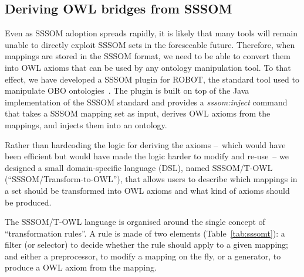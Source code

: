 \documentclass{ceurart}
\begin{document}
\subsection{Deriving OWL bridges from SSSOM}

Even as SSSOM adoption spreads rapidly, it is likely that many tools
will remain unable to directly exploit SSSOM sets in the foreseeable
future.  Therefore, when mappings are stored in the SSSOM format, we
need to be able to convert them into OWL axioms that can be used by any
ontology manipulation tool. To that effect, we have developed a SSSOM
plugin for ROBOT, the standard tool used to manipulate OBO
ontologies~\cite{jackson2019}.  The plugin is built on top of the Java
implementation of the SSSOM standard and provides a \emph{sssom:inject}
command that takes a SSSOM mapping set as input, derives OWL axioms from
the mappings, and injects them into an ontology.

Rather than hardcoding the logic for deriving the axioms --~which would
have been efficient but would have made the logic harder to modify and
re-use~-- we designed a small domain-specific language (DSL), named
SSSOM/T-OWL (``SSSOM/Transform-to-OWL''), that allows users to describe
which mappings in a set should be transformed into OWL axioms and what
kind of axioms should be produced.

The SSSOM/T-OWL language is organised around the single concept of
``transformation rules''. A rule is made of two elements
(Table~\ref{tab:sssomt}): a filter (or selector) to decide whether the
rule should apply to a given mapping; and either a preprocessor, to
modify a mapping on the fly, or a generator, to produce a OWL axiom from
the mapping.
\end{document}
